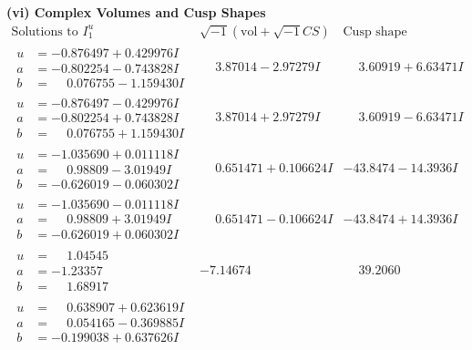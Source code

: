 \documentclass[1p]{elsarticle_modified}
\theoremstyle{definition}
\newcommand{\I}{\sqrt{-1}}
\begin{document}
\newpage\flushleft \textbf{(vi) Complex Volumes and Cusp Shapes}
$$\begin{array}{c|c|c}  
\text{Solutions to }I^u_{1}& \I (\text{vol} + \sqrt{-1}CS) & \text{Cusp shape}\\
 \hline 
\begin{aligned}
u &= -0.876497 + 0.429976 I \\
a &= -0.802254 - 0.743828 I \\
b &= \phantom{-}0.076755 - 1.159430 I\end{aligned}
 & \phantom{-}3.87014 - 2.97279 I & \phantom{-}3.60919 + 6.63471 I \\ \hline\begin{aligned}
u &= -0.876497 - 0.429976 I \\
a &= -0.802254 + 0.743828 I \\
b &= \phantom{-}0.076755 + 1.159430 I\end{aligned}
 & \phantom{-}3.87014 + 2.97279 I & \phantom{-}3.60919 - 6.63471 I \\ \hline\begin{aligned}
u &= -1.035690 + 0.011118 I \\
a &= \phantom{-}0.98809 - 3.01949 I \\
b &= -0.626019 - 0.060302 I\end{aligned}
 & \phantom{-}0.651471 + 0.106624 I & -43.8474 - 14.3936 I \\ \hline\begin{aligned}
u &= -1.035690 - 0.011118 I \\
a &= \phantom{-}0.98809 + 3.01949 I \\
b &= -0.626019 + 0.060302 I\end{aligned}
 & \phantom{-}0.651471 - 0.106624 I & -43.8474 + 14.3936 I \\ \hline\begin{aligned}
u &= \phantom{-}1.04545\phantom{ +0.000000I} \\
a &= -1.23357\phantom{ +0.000000I} \\
b &= \phantom{-}1.68917\phantom{ +0.000000I}\end{aligned}
 & -7.14674\phantom{ +0.000000I} & \phantom{-}39.2060\phantom{ +0.000000I} \\ \hline\begin{aligned}
u &= \phantom{-}0.638907 + 0.623619 I \\
a &= \phantom{-}0.054165 - 0.369885 I \\
b &= -0.199038 + 0.637626 I\end{aligned}

\end{array}$$
\end{document}
